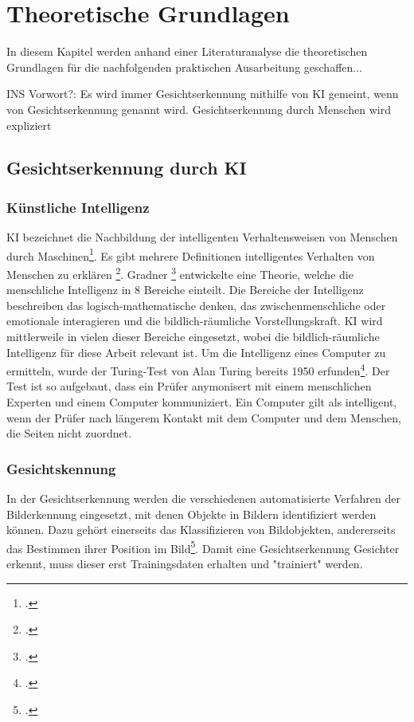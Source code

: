 \newpage
\section{Theoretische Grundlagen} \label{theorie}
In diesem Kapitel werden anhand einer Literaturanalyse die theoretischen Grundlagen für die nachfolgenden praktischen Ausarbeitung geschaffen...

INS Vorwort?: Es wird immer Gesichtserkennung mithilfe von KI gemeint, wenn von Gesichtserkennung genannt wird. Gesichtserkennung durch Menschen wird expliziert  

\subsection{Gesichtserkennung durch KI}

\subsubsection{Künstliche Intelligenz}
\acf*{KI} bezeichnet die Nachbildung der intelligenten Verhaltensweisen von Menschen durch Maschinen\footcite[Vgl. ][]{copeland_artificial_2022}. Es gibt mehrere Definitionen intelligentes Verhalten von Menschen zu erklären \footcite[Vgl. ][]{paas_was_2020}. Gradner \footcite[Vgl. ][]{gardner_frames_1984} entwickelte eine Theorie, welche die menschliche Intelligenz in 8 Bereiche einteilt. Die Bereiche der Intelligenz beschreiben \zb das logisch-mathematische denken, das zwischenmenschliche oder emotionale interagieren und die bildlich-räumliche Vorstellungskraft. \ac{KI} wird mittlerweile in vielen dieser Bereiche eingesetzt, wobei die bildlich-räumliche Intelligenz für diese Arbeit relevant ist. Um die Intelligenz eines Computer zu ermitteln, wurde der Turing-Test von Alan Turing bereits 1950 erfunden\footcite[Vgl. ][]{moor_turing_2003}. Der Test ist so aufgebaut, dass ein Prüfer anymonisert mit einem menschlichen Experten und einem Computer kommuniziert. Ein Computer gilt als intelligent, wenn der Prüfer nach längerem Kontakt mit dem Computer und dem Menschen, die Seiten nicht zuordnet. 

\subsubsection{Gesichtskennung}
In der Gesichtserkennung werden die verschiedenen automatisierte Verfahren der Bilderkennung eingesetzt, mit denen Objekte in Bildern identifiziert werden können. Dazu gehört einerseits das Klassifizieren von Bildobjekten, andererseits das Bestimmen ihrer Position im Bild\footcite[Vgl. ][Seite 119]{paas_was_2020}. Damit eine Gesichtserkennung Gesichter erkennt, muss dieser erst Trainingsdaten erhalten und "trainiert" werden.


